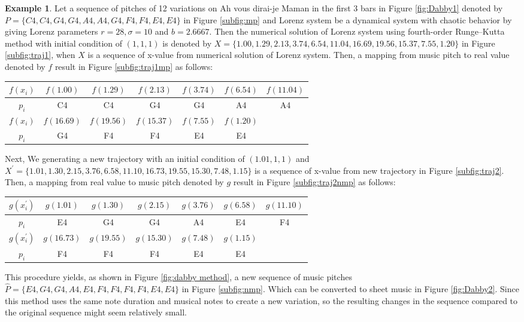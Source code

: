 \documentclass[11pt]{article}
\theoremstyle{definition}
\newtheorem{example}[theorem]{Example}
\begin{document}
\begin{example}
Let a sequence of pitches of 12 variations on Ah vous dirai-je Maman in the first 3 bars in Figure \ref{fig:Dabby1} denoted by $P = \{C4, C4, G4, G4, A4, A4, G4, F4, F4, E4, E4 \}$ in Figure \ref{subfig:mp} and Lorenz system be a dynamical system with chaotic behavior by giving Lorenz parameters $r = 28, \sigma=10$ and $b = 2.6667 $. Then the numerical solution of Lorenz system using fourth-order Runge–Kutta method with initial condition of $(1,1,1)$ is denoted by $X = \{1.00, 1.29, 2.13, 3.74, 6.54, 11.04, 16.69, 19.56, 15.37, 7.55, 1.20\}$ in Figure \ref{subfig:traj1}, when $X$ is a sequence of x-value from numerical solution of Lorenz system. Then, a mapping from music pitch to real value denoted by $f$ result in Figure \ref{subfig:traj1mp} as follows:

\begin{center}
\begin{tabular}{|c||c|c|c|c|c|c|}
\hline
$f(x_i)$ & $f(1.00)$ & $f(1.29)$ & $f(2.13)$ & $f(3.74)$ & $f(6.54)$ & $f(11.04)$ \\
\hline
$p_i$ & C4 & C4 & G4 & G4 & A4 & A4 \\
\hline
$f(x_i)$ & $f(16.69)$ & $f(19.56)$ & $f(15.37)$ & $f(7.55)$ & $f(1.20)$ & \\
\hline
$p_i$ & G4 & F4 & F4 & E4 & E4 &  \\
\hline
\end{tabular}
\end{center}

Next, We generating a new trajectory with an initial condition of $(1.01,1,1)$ and $X^\prime = \{ 1.01, 1.30, 2.15, 3.76, 6.58, 11.10, 16.73, 19.55, 15.30, 7.48, 1.15 \} $ is a sequence of x-value from new trajectory in Figure \ref{subfig:traj2}. Then, a mapping from real value to music pitch denoted by $g$ result in Figure \ref{subfig:traj2nmp} as follows:

\begin{center}
\begin{tabular}{|c||c|c|c|c|c|c|}
\hline
$g(x^\prime_i)$ & $g(1.01)$ & $g(1.30)$ & $g(2.15)$ & $g(3.76)$ & $g(6.58)$ & $g(11.10)$ \\
\hline
$p_i$ & E4 & G4 & G4 & A4 & E4 & F4 \\
\hline
$g(x^\prime_i)$ & $g(16.73)$ & $g(19.55)$ & $g(15.30)$ & $g(7.48)$ & $g(1.15)$ & \\
\hline
$p_i$ & F4 & F4 & F4 & E4 & E4 &  \\
\hline
\end{tabular}
\end{center}
This procedure yields, as shown in Figure \ref{fig:dabby method}, a new sequence of music pitches \\ $\hat{P} =\{E4, G4, G4, A4, E4, F4, F4, F4, F4, E4, E4 \}$ in Figure \ref{subfig:nmp}. Which can be converted to sheet music in Figure \ref{fig:Dabby2}. Since this method uses the same note duration and musical notes to create a new variation, so the resulting changes in the sequence compared to the original sequence might seem relatively small.
\end{example}
\end{document}
